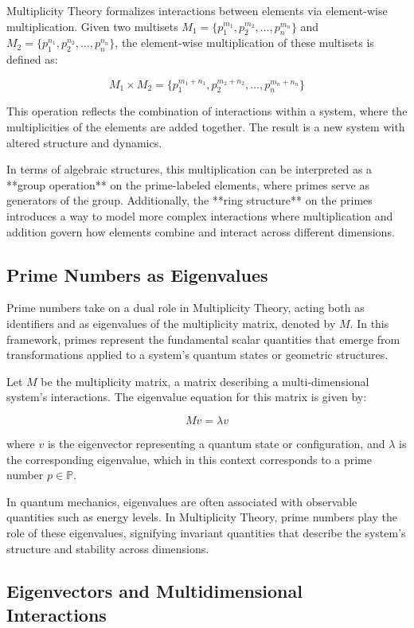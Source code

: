 \documentclass[12pt]{article}
\begin{document}
Multiplicity Theory formalizes interactions between elements via element-wise multiplication. Given two multisets \( M_1 = \{p_1^{m_1}, p_2^{m_2}, \dots, p_n^{m_n}\} \) and \( M_2 = \{p_1^{n_1}, p_2^{n_2}, \dots, p_n^{n_n}\} \), the element-wise multiplication of these multisets is defined as:

$$M_1 \times M_2 = \{p_1^{m_1 + n_1}, p_2^{m_2 + n_2}, \dots, p_n^{m_n + n_n}\}$$

This operation reflects the combination of interactions within a system, where the multiplicities of the elements are added together. The result is a new system with altered structure and dynamics.

In terms of algebraic structures, this multiplication can be interpreted as a **group operation** on the prime-labeled elements, where primes serve as generators of the group. Additionally, the **ring structure** on the primes introduces a way to model more complex interactions where multiplication and addition govern how elements combine and interact across different dimensions.

\subsection{Prime Numbers as Eigenvalues}

Prime numbers take on a dual role in Multiplicity Theory, acting both as identifiers and as eigenvalues of the multiplicity matrix, denoted by \( M \). In this framework, primes represent the fundamental scalar quantities that emerge from transformations applied to a system's quantum states or geometric structures.

Let \( M \) be the multiplicity matrix, a matrix describing a multi-dimensional system's interactions. The eigenvalue equation for this matrix is given by:

$$M v = \lambda v$$

where \( v \) is the eigenvector representing a quantum state or configuration, and \( \lambda \) is the corresponding eigenvalue, which in this context corresponds to a prime number \( p \in \mathbb{P} \).

In quantum mechanics, eigenvalues are often associated with observable quantities such as energy levels. In Multiplicity Theory, prime numbers play the role of these eigenvalues, signifying invariant quantities that describe the system's structure and stability across dimensions.

\subsection{Eigenvectors and Multidimensional Interactions}
\end{document}
